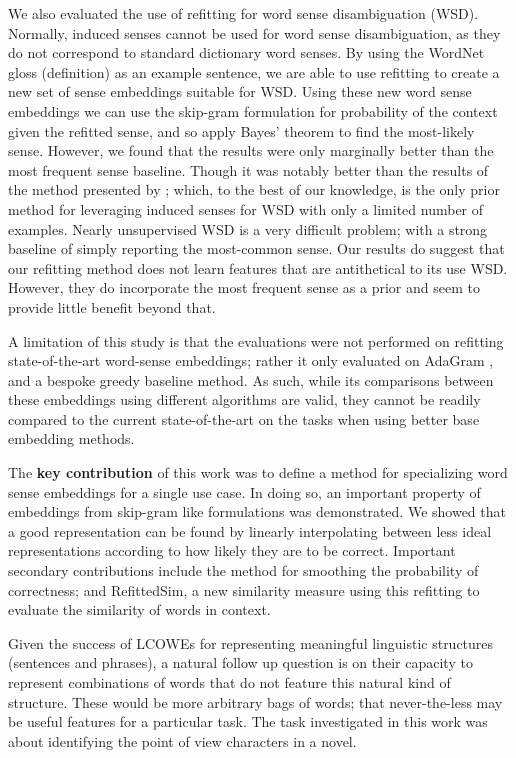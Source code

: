 \documentclass{book}
\begin{document}
We also evaluated the use of refitting for word sense disambiguation (WSD).
Normally, induced senses cannot be used for word sense disambiguation, as they do not correspond to standard dictionary word senses.
By using the WordNet gloss (definition) as an example sentence, we are able to use refitting to create a new set of sense embeddings suitable for WSD.
Using these new word sense embeddings we can use the skip-gram formulation for probability of the context given the  refitted sense, and so apply Bayes' theorem to find the most-likely sense.
However, we found that the results were only marginally better than the most frequent sense baseline.
Though it was notably better than the results of the method presented by \citet{agirre2006}; which, to the best of our knowledge, is the only prior method for leveraging induced senses for WSD with only a limited number of examples.
Nearly unsupervised WSD is a very difficult problem; with a strong baseline of simply reporting the most-common sense.
Our results do suggest that our refitting method does not learn features that are antithetical to its use WSD.
However, they do incorporate the most frequent sense as a prior and seem to provide little benefit beyond that.

A limitation of this study is that the evaluations were not performed on refitting state-of-the-art word-sense embeddings; rather it only evaluated on AdaGram \citep{AdaGrams}, and a bespoke greedy baseline method.
As such, while its comparisons between these embeddings using different algorithms are valid,
they cannot be readily compared to the current state-of-the-art on the tasks when using better base embedding methods.


The \textbf{key contribution} of this work was to define a method for specializing word sense embeddings for a single use case.
In doing so, an important property of embeddings from skip-gram like formulations was demonstrated.
We showed that a good representation can be found by linearly interpolating between less ideal representations according to how likely they are to be correct.
Important secondary contributions include the method for smoothing the probability of correctness;
and RefittedSim, a new similarity measure using this refitting to evaluate the similarity of words in context.



Given the success of LCOWEs for representing meaningful linguistic structures (sentences and phrases),
a natural follow up question is on their capacity to represent combinations of words that do not feature this natural kind of structure.
These would be more arbitrary bags of words; that never-the-less may be useful features for a particular task.
The task investigated in this work was about identifying the point of view characters in a novel.
\end{document}
